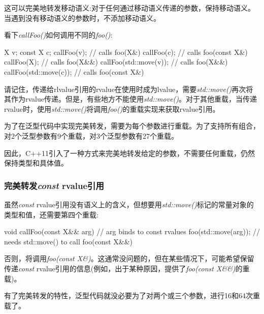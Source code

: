 这可以完美地转发移动语义:对于任何通过移动语义传递的参数，保持移动语义。当遇到没有移动语义的参数时，不添加移动语义。

看下\textit{callFoo()}如何调用不同的\textit{foo()}:

\begin{cppcode}
X v;
const X c;
callFoo(v); // calls foo(X&)
callFoo(c); // calls foo(const X&)
callFoo(X{}); // calls foo(X&&)
callFoo(std::move(v)); // calls foo(X&&)
callFoo(std::move(c)); // calls foo(const X&)
\end{cppcode}

请记住，传递给rlvalue引用的rvalue在使用时成为lvalue，需要\textit{std::move()}再次将其作为rvalue传递。但是，有些地方不能使用\textit{std::move()}。对于其他重载，当传递rvalue时，使用\textit{std::move()}将调用\textit{foo()}的重载实现来获取rvalue引用。

为了在泛型代码中实现完美转发，需要为每个参数进行重载。为了支持所有组合，对2个泛型参数有9个重载，对3个泛型参数有27个重载。

因此，C++11引入了一种方式来完美地转发给定的参数，不需要任何重载，仍然保持类型和具体值。

\subsubsection{完美转发\textit{const} rvalue引用}

虽然\textit{const} rvalue引用没有语义上的含义，但想要用\textit{std::move()}标记的常量对象的类型和值，还需要第四个重载:

\begin{cppcode}
void callFoo(const X&& arg) { // arg binds to const rvalues
	foo(std::move(arg)); // needs std::move() to call foo(const X&&)
}
\end{cppcode}

否则，将调用\textit{foo(const X\&)}。这通常没问题的，但在某些情况下，可能希望保留传递\textit{const} rvalue引用的信息(例如，出于某种原因，提供了\textit{foo(const X\&\&)}的重载)。

有了完美转发的特性，泛型代码就没必要为了对两个或三个参数，进行16和64次重载了。


















